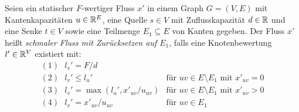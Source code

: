 \begin{definition}\label{def-thin-flow}
	Seien ein statischer $F$-wertiger Fluss $x'$ in einem Graph $G=(V,E)$ mit Kantenkapazitäten $u\in\mathbb{R}^E$, eine Quelle $s\in V$ mit Zuflusskapazität $d\in\mathbb{R}$ und eine Senke $t\in V$ sowie eine Teilmenge $E_1\subseteq E$ von Kanten gegeben.
	Der Fluss $x'$ heißt \emph{schmaler Fluss mit Zurücksetzen auf $E_1$}, falls eine Knotenbewertung $l'\in\mathbb{R}^V$ existiert mit:
	$$\begin{array}{ll}
	(1)~~~	l_s' = F/d& \\
	(2)~~~	l_v' \leq l_u' &\text{für $uv\in E \setminus E_1$ mit $x'_{uv}=0$}\\
	(3)~~~	l_v' = \max(l_u', x'_{uv} / u_{uv} ) &\text{für $uv\in E\setminus E_1$ mit $x'_{uv} > 0$}\\
	(4)~~~	l_v' = x'_{uv} / u_{uv} & \text{für $uv\in E_1$}
	\end{array}$$
\end{definition}

